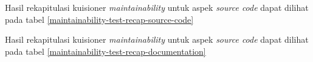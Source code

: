 Hasil rekapitulasi kuisioner \textit{maintainability} untuk aspek \textit{source code} dapat dilihat pada tabel \ref{maintainability-test-recap-source-code}

Hasil rekapitulasi kuisioner \textit{maintainability} untuk aspek \textit{source code} dapat dilihat pada tabel \ref{maintainability-test-recap-documentation}
